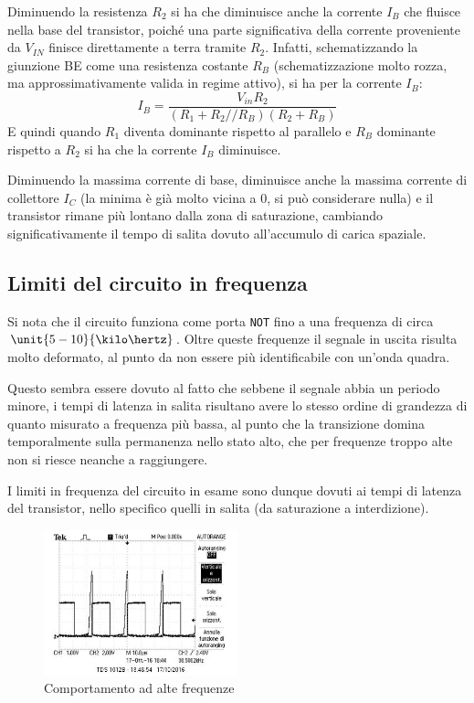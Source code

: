 \documentclass[10pt,a4paper]{article}
\def\code#1{\texttt{#1}}
\begin{document}
Diminuendo la resistenza $R_2$ si ha che diminuisce anche la corrente $I_B$ che fluisce nella base del transistor, poiché una parte significativa della corrente proveniente da $V_{IN}$ finisce direttamente a terra tramite $R_2$. Infatti, schematizzando la giunzione BE come una resistenza costante $R_B$ (schematizzazione molto rozza, ma approssimativamente valida in regime attivo), si ha per la corrente $I_B$:
\begin{equation*}
I_B = \frac{V_{in} R_2}{(R_1 + R_2 // R_B)(R_2 + R_B)}
\end{equation*}
E quindi quando $R_1$ diventa dominante rispetto al parallelo e $R_B$ dominante rispetto a $R_2$ si ha che la corrente $I_B$ diminuisce.

Diminuendo la massima corrente di base, diminuisce anche la massima corrente di collettore $I_C$ (la minima è già molto vicina a 0, si può considerare nulla) e il transistor rimane più lontano dalla zona di saturazione, cambiando significativamente il tempo di salita dovuto all'accumulo di carica spaziale.

\subsection{Limiti del circuito in frequenza}
Si nota che il circuito funziona come porta \code{NOT} fino a una frequenza di circa $\unit{5-10}{\kilo\hertz}$. Oltre queste frequenze il segnale in uscita risulta molto deformato, al punto da non essere più identificabile con un'onda quadra.

Questo sembra essere dovuto al fatto che sebbene il segnale abbia un periodo minore, i tempi di latenza in salita risultano avere lo stesso ordine di grandezza di quanto misurato a frequenza più bassa, al punto che la transizione domina temporalmente sulla permanenza nello stato alto, che per frequenze troppo alte non si riesce neanche a raggiungere.

I limiti in frequenza del circuito in esame sono dunque dovuti ai tempi di latenza del transistor, nello specifico quelli in salita (da saturazione a interdizione).

\begin{figure}[h!]
\centering
\includegraphics[width=0.5\textwidth]{../oscilloscopio/raise_problem.jpg}
\caption{Comportamento ad alte frequenze}
\end{figure}
\end{document}
